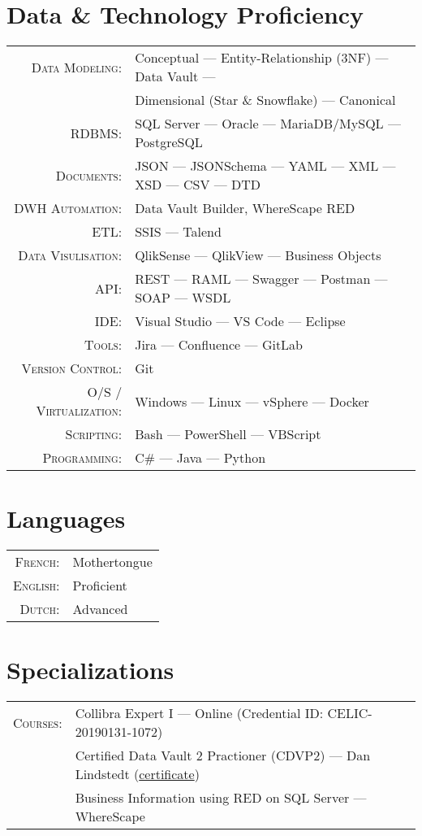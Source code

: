 \documentclass[a4paper,10pt]{article}
\begin{document}
\section{Data \& Technology Proficiency}
\begin{tabular}{rl}
  \textsc{Data Modeling:}& Conceptual — Entity-Relationship (3NF) — Data Vault — \\
  &Dimensional (Star \& Snowflake) — Canonical \\
  \textsc{RDBMS:}& SQL Server — Oracle — MariaDB/MySQL — PostgreSQL \\
  \textsc{Documents:}& JSON — JSONSchema — YAML — XML — XSD — CSV — DTD \\
  \textsc{DWH Automation:}& Data Vault Builder, WhereScape RED \\
  \textsc{ETL:}& SSIS — Talend\\
  \textsc{Data Visulisation:}& QlikSense — QlikView — Business Objects \\
  \textsc{API:}& REST — RAML — Swagger — Postman — SOAP — WSDL\\
  \textsc{IDE:}& Visual Studio — VS Code — Eclipse\\
  \textsc{Tools:}& Jira — Confluence — GitLab\\
  \textsc{Version Control:}& Git \\
  \textsc{O/S / Virtualization:}& Windows — Linux — vSphere — Docker\\
  \textsc{Scripting}:&Bash — PowerShell — VBScript \\
  \textsc{Programming}:&C\# — Java — Python\\
\end{tabular}

\section{Languages}
\begin{tabular}{rl}
  \textsc{French:}& Mothertongue\\
  \textsc{English:}& Proficient\\
  \textsc{Dutch:}& Advanced\\
\end{tabular}

\section{Specializations}
\begin{tabular}{rl}
  \textsc{Courses:}
  &Collibra Expert I — Online (Credential ID: CELIC-20190131-1072)\\
  &Certified Data Vault 2 Practioner (CDVP2) — Dan Lindstedt (\href{https://max.pow.is/assets/5_2_12900_1435331244_CDVP2_Certificate.pdf}{certificate})\\
  &Business Information using RED on SQL Server — WhereScape
\end{tabular}
\end{document}
